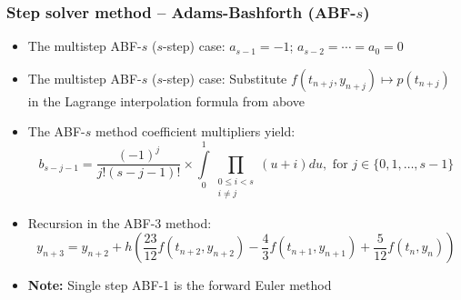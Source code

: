 \documentclass[usenames,svgnames,dvipsnames,10pt]{beamer}
\begin{document}
\begin{frame}
\frametitle{Step solver method -- Adams-Bashforth (ABF-$s$)}

\begin{itemize} 

\item The multistep ABF-$s$ ($s$-step) case: $a_{s-1}=-1$; $a_{s-2}=\cdots=a_0=0$
\item The multistep ABF-$s$ ($s$-step) case: 
      Substitute $f(t_{n+j}, y_{n+j}) \mapsto p(t_{n+j})$ in the Lagrange interpolation formula from above 
\item The ABF-$s$ method coefficient multipliers yield: 
      $$b_{s-j-1} = \frac{(-1)^j}{j!(s-j-1)!} \times \int\limits_0^1 \prod\limits_{\substack{0 \leq i < s \\ i \neq j}} (u+i) du, 
       \text{ for } j \in \{0,1,\ldots,s-1\}$$ 
\item Recursion in the ABF-3 method: 
      $$y_{n+3} = y_{n+2} + h\left(\frac{23}{12}f(t_{n+2},y_{n+2}) - \frac{4}{3} f(t_{n+1},y_{n+1}) + \frac{5}{12} f(t_n, y_n)\right)$$ 
\item \textbf{Note:} Single step ABF-1 is the forward Euler method 

\end{itemize} 

\end{frame}
\end{document}
